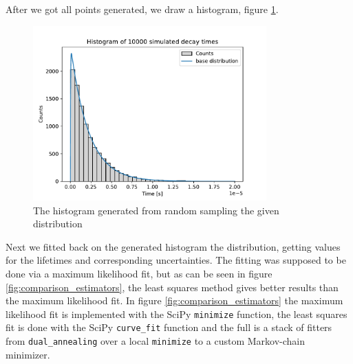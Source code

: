 \documentclass[11pt, a4paper, oneside]{book}
\newcommand\Plotwidth{0.8}
\begin{document}
After we got all points generated, we draw a histogram, figure \ref{fig:histogram}.

\begin{figure}[h]
    \centering
    \includegraphics[width=\Plotwidth\textwidth]{images/simulated_decay_histogram.pdf}
    \caption{The histogram generated from random sampling the given distribution}
    \label{fig:histogram}
\end{figure}

Next we fitted back on the generated histogram the distribution, getting values for the lifetimes and corresponding uncertainties. The fitting was supposed to be done via a maximum likelihood fit, but as can be seen in figure \ref{fig:comparison_estimators}, the least squares method gives better results than the maximum likelihood fit. In figure \ref{fig:comparison_estimators} the maximum likelihood fit is implemented with the SciPy \lstinline{minimize} function, the least squares fit is done with the SciPy \lstinline{curve_fit} function and the full is a stack of fitters from \lstinline{dual_annealing} over a local \lstinline{minimize} to a custom Markov-chain minimizer.
\end{document}
